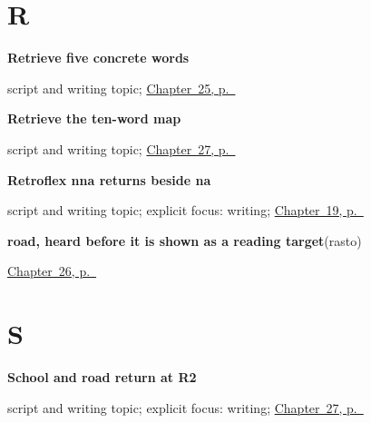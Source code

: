 \section*{R}

\noindent\begin{minipage}[t]{\linewidth}
\raggedright
\textbf{Retrieve five concrete words}\par
\footnotesize script and writing topic; \hyperref[ch:gu-hand-money-map]{Chapter~25, p.~\pageref*{ch:gu-hand-money-map}}
\end{minipage}\par\smallskip

\noindent\begin{minipage}[t]{\linewidth}
\raggedright
\textbf{Retrieve the ten-word map}\par
\footnotesize script and writing topic; \hyperref[ch:gu-village-shop-ten]{Chapter~27, p.~\pageref*{ch:gu-village-shop-ten}}
\end{minipage}\par\smallskip

\noindent\begin{minipage}[t]{\linewidth}
\raggedright
\textbf{Retroflex nna returns beside na}\par
\footnotesize script and writing topic; explicit focus: writing; \hyperref[ch:gu-r4-script-names]{Chapter~19, p.~\pageref*{ch:gu-r4-script-names}}
\end{minipage}\par\smallskip

\noindent\begin{minipage}[t]{\linewidth}
\raggedright
\textbf{road, heard before it is shown as a reading target}\enspace\emph{}\enspace(rasto)\par
\footnotesize \hyperref[ch:gu-city-school-road]{Chapter~26, p.~\pageref*{ch:gu-city-school-road}}
\end{minipage}\par\smallskip

\section*{S}

\noindent\begin{minipage}[t]{\linewidth}
\raggedright
\textbf{School and road return at R2}\par
\footnotesize script and writing topic; explicit focus: writing; \hyperref[ch:gu-village-shop-ten]{Chapter~27, p.~\pageref*{ch:gu-village-shop-ten}}
\end{minipage}\par\smallskip


